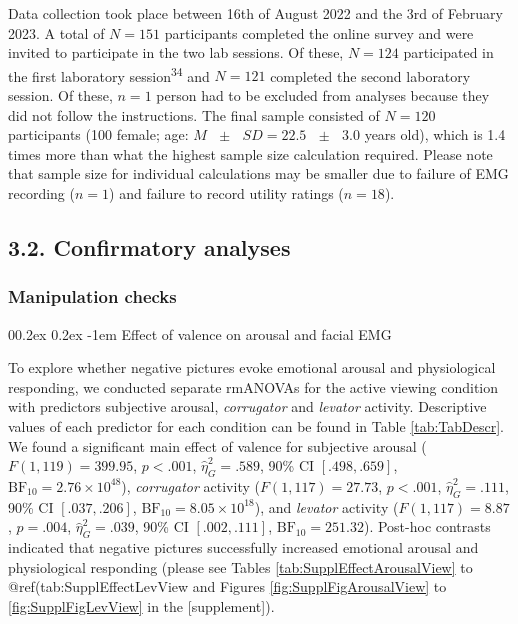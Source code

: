\documentclass[
  man,floatsintext]{apa6}
\makeatletter
\let\oldparagraph\paragraph
\renewcommand{\paragraph}[1]{\oldparagraph{#1}\mbox{}}
\renewcommand{\paragraph}{\@startsection{paragraph}{4}{\parindent}%
  {0\baselineskip \@plus 0.2ex \@minus 0.2ex}%
  {-1em}%
  {\normalfont\normalsize\bfseries\itshape\typesectitle}}
\makeatother
\begin{document}
Data collection took place between 16th of August 2022 and the 3rd of February 2023.
A total of \(N=151\) participants completed the online survey and were invited to participate in the two lab sessions.
Of these, \(N=124\) participated in the first laboratory session\textsuperscript{34} and \(N=121\) completed the second laboratory session.
Of these, \(n=1\) person had to be excluded from analyses because they did not follow the instructions.
The final sample consisted of \(N=120\) participants (100 female; age: \(M\text{ }\pm\text{ }SD =22.5\text{ }\pm\text{ }3.0\) years old), which is 1.4 times more than what the highest sample size calculation required.
Please note that sample size for individual calculations may be smaller due to failure of EMG recording (\(n=1\)) and failure to record utility ratings (\(n=18\)).

\hypertarget{confirmatory-analyses}{%
\subsection{3.2. Confirmatory analyses}\label{confirmatory-analyses}}

\hypertarget{manipulation-checks}{%
\subsubsection{Manipulation checks}\label{manipulation-checks}}

\hypertarget{effect-of-valence-on-arousal-and-facial-emg}{%
\paragraph{Effect of valence on arousal and facial EMG}\label{effect-of-valence-on-arousal-and-facial-emg}}

To explore whether negative pictures evoke emotional arousal and physiological responding, we conducted separate rmANOVAs for the active viewing condition with predictors subjective arousal, \emph{corrugator} and \emph{levator} activity.
Descriptive values of each predictor for each condition can be found in Table \ref{tab:TabDescr}.
We found a significant main effect of valence for subjective arousal (\(F(1, 119) = 399.95\), \(p < .001\), \(\hat{\eta}^2_G = .589\), 90\% CI \([.498, .659]\), \(\mathrm{BF}_{\textrm{10}} = 2.76 \times 10^{48}\)), \emph{corrugator} activity (\(F(1, 117) = 27.73\), \(p < .001\), \(\hat{\eta}^2_G = .111\), 90\% CI \([.037, .206]\), \(\mathrm{BF}_{\textrm{10}} = 8.05 \times 10^{18}\)), and \emph{levator} activity (\(F(1, 117) = 8.87\), \(p = .004\), \(\hat{\eta}^2_G = .039\), 90\% CI \([.002, .111]\), \(\mathrm{BF}_{\textrm{10}} = 251.32\)).
Post-hoc contrasts indicated that negative pictures successfully increased emotional arousal and physiological responding (please see Tables \ref{tab:SupplEffectArousalView} to @ref(tab:SupplEffectLevView and Figures \ref{fig:SupplFigArousalView} to \ref{fig:SupplFigLevView} in the {[}supplement{]}).
\end{document}
